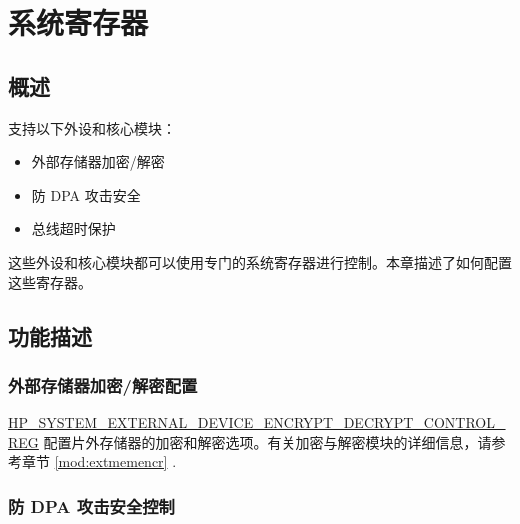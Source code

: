 \documentclass[main\_\_CN.tex]{subfiles}
\begin{document}

\ifglobal
\else
    {\let\clearpage\relax \listoftodos}
    {\let\clearpage\relax \listofdonetodos}
    \tableofcontents
\fi



\chapter{系统寄存器}
\label{mod:sysreg}
\hypertarget{sysreg}{}

\section{概述}
\label{sec:sysreg-features}

\chipname{} 支持以下外设和核心模块：

\begin{itemize}
    \item 外部存储器加密/解密
    \item 防 DPA 攻击安全
    \item 总线超时保护
\end{itemize}

这些外设和核心模块都可以使用专门的系统寄存器进行控制。本章描述了如何配置这些寄存器。


\section{功能描述}

\subsection{外部存储器加密/解密配置}

\hyperref[regdesc:HPSYSTEMEXTERNALDEVICEENCRYPTDECRYPTCONTROLREG]{HP\_SYSTEM\_EXTERNAL\_DEVICE\_ENCRYPT\_DECRYPT\_CONTROL\_REG} 配置片外存储器的加密和解密选项。有关加密与解密模块的详细信息，请参考章节 \ref{mod:extmemencr} \textit{}.


\subsection{防 DPA 攻击安全控制}
\label{sec:sysreg-anti-dpa-attack-security-control}
\end{document}
